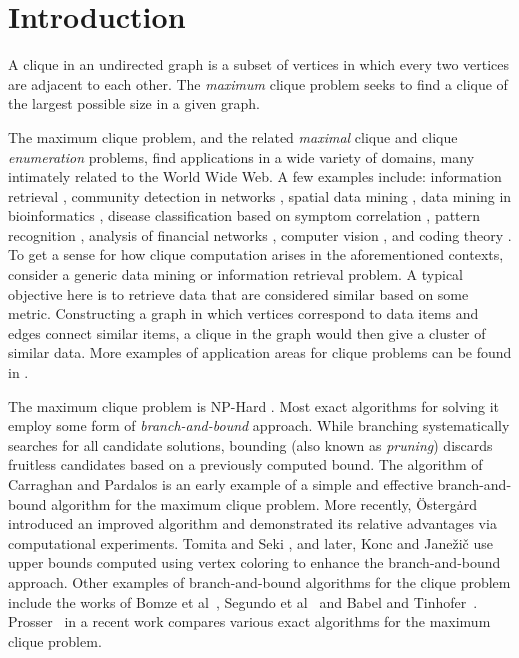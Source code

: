 \section{Introduction}
\label{sec:intro}

A clique in an undirected graph is a subset of vertices in which every two vertices
are adjacent to each other. The {\em maximum} clique problem seeks to find 
a clique of the largest possible size in a given graph.

The maximum clique problem, and the related {\em maximal} clique and 
clique {\em enumeration} problems, find applications in a wide variety of domains,
many intimately related to the World Wide Web. 
A few examples include:  
information retrieval \cite{Augustson:1970:AGT:321607.321608}, 
community detection in networks \cite{Fortunato_2010,cite-key,5586496}, 
spatial data mining \cite{wang2009order},
data mining in bioinformatics \cite{19566964},
disease classification based on symptom correlation \cite{Bonner:1964:CT:1662386.1662389}, 
pattern recognition \cite{1211348},
analysis of financial networks \cite{RePEc:eee:csdana:v:48:y:2005:i:2:p:431-443},
computer vision \cite{Horaud:1989:SCT:68871.68875}, and
coding theory \cite{brouwer}.
To get a sense for how clique computation arises in the aforementioned contexts, 
consider a generic data mining or information retrieval problem. A typical objective
here is to retrieve data that are considered similar based on some metric. 
Constructing a graph in which vertices correspond to data items and 
edges connect similar items, a clique in the graph would then give a cluster of similar data. 
More examples of application areas for clique problems can be found in 
\cite{Gutin2004,citeulike:4058448}.

The maximum clique problem is NP-Hard \cite{Garey:1979:CIG:578533}.
Most exact algorithms for solving it employ some form of {\it branch-and-bound} approach. 
While branching systematically searches for all candidate solutions, bounding (also known as {\em pruning}) discards fruitless candidates based on a previously computed bound. 
The algorithm of Carraghan and Pardalos \cite{pardalos} is an early example of 
a simple and  effective branch-and-bound algorithm for the maximum clique problem.
More recently,  \"{O}sterg\.{a}rd \cite{ostergard} introduced 
an improved algorithm and demonstrated its relative advantages via computational experiments. 
Tomita and Seki \cite{citeulike:7905505}, and later, Konc and Jane\v{z}i\v{c} \cite{konc2007improved}
use upper bounds computed using vertex coloring to enhance the branch-and-bound approach. 
Other examples of branch-and-bound algorithms for the clique problem include 
the works of Bomze et al~\cite{Bomze99themaximum}, Segundo et al~\cite{SanSegundo}
and Babel and Tinhofer~\cite{babel1990branch}.
Prosser~\cite{prosser2012} in a recent work compares various exact algorithms 
for the maximum clique problem. %

